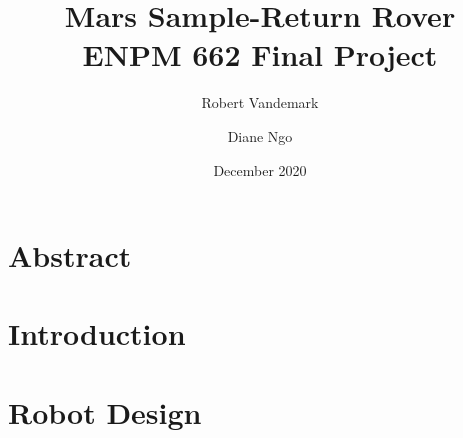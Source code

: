 \documentclass[a4paper, 12pt]{report}
\title{Mars Sample-Return Rover \\
\large ENPM 662 Final Project}
\date{December 2020}
\author{Robert Vandemark \and Diane Ngo}
\begin{document}
	
	\setcounter{page}{1}
	\maketitle
	
	\tableofcontents
	\newpage
	
	\chapter{Abstract}
	
	
	\chapter{Introduction}
	
	
	\chapter{Robot Design}
	
	
	\begin{center}
		\printbibliography[heading=bibintoc, title={Bibliography}]
	\end{center}
\end{document}

